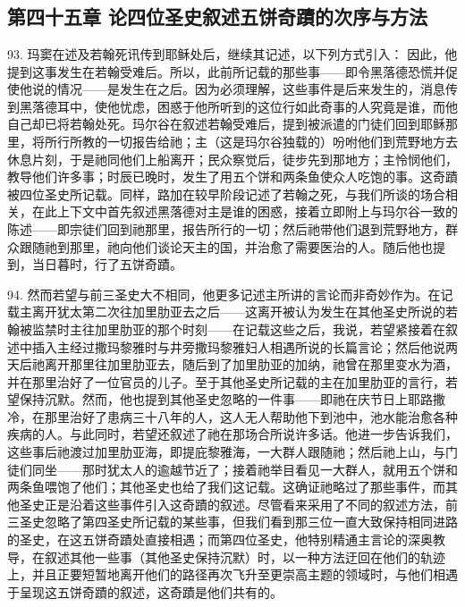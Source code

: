 
\section{}


\subsection{第四十五章 论四位圣史叙述五饼奇蹟的次序与方法}

93. 玛窦在述及若翰死讯传到耶稣处后，继续其记述，以下列方式引入： 因此，他提到这事发生在若翰受难后。所以，此前所记载的那些事——即令黑落德恐慌并促使他说的情况——是发生在之后。因为必须理解，这些事件是后来发生的，消息传到黑落德耳中，使他忧虑，困惑于他所听到的这位行如此奇事的人究竟是谁，而他自己却已将若翰处死。玛尔谷在叙述若翰受难后，提到被派遣的门徒们回到耶稣那里，将所行所教的一切报告给祂；主（这是玛尔谷独载的）吩咐他们到荒野地方去休息片刻，于是祂同他们上船离开；民众察觉后，徒步先到那地方；主怜悯他们，教导他们许多事；时辰已晚时，发生了用五个饼和两条鱼使众人吃饱的事。这奇蹟被四位圣史所记载。同样，路加在较早阶段记述了若翰之死，与我们所谈的场合相关，在此上下文中首先叙述黑落德对主是谁的困惑，接着立即附上与玛尔谷一致的陈述——即宗徒们回到祂那里，报告所行的一切；然后祂带他们退到荒野地方，群众跟随祂到那里，祂向他们谈论天主的国，并治愈了需要医治的人。随后他也提到，当日暮时，行了五饼奇蹟。\par

94. 然而若望与前三圣史大不相同，他更多记述主所讲的言论而非奇妙作为。在记载主离开犹太第二次往加里肋亚去之后——这离开被认为发生在其他圣史所说的若翰被监禁时主往加里肋亚的那个时刻——在记载这些之后，我说，若望紧接着在叙述中插入主经过撒玛黎雅时与井旁撒玛黎雅妇人相遇所说的长篇言论；然后他说两天后祂离开那里往加里肋亚去，随后到了加里肋亚的加纳，祂曾在那里变水为酒，并在那里治好了一位官员的儿子。至于其他圣史所记载的主在加里肋亚的言行，若望保持沉默。然而，他也提到其他圣史忽略的一件事——即祂在庆节日上耶路撒冷，在那里治好了患病三十八年的人，这人无人帮助他下到池中，池水能治愈各种疾病的人。与此同时，若望还叙述了祂在那场合所说许多话。他进一步告诉我们，这些事后祂渡过加里肋亚海，即提庇黎雅海，一大群人跟随祂；然后祂上山，与门徒们同坐——那时犹太人的逾越节近了；接着祂举目看见一大群人，就用五个饼和两条鱼喂饱了他们；其他圣史也给了我们这记载。这确证祂略过了那些事件，而其他圣史正是沿着这些事件引入这奇蹟的叙述。尽管看来采用了不同的叙述方法，前三圣史忽略了第四圣史所记载的某些事，但我们看到那三位一直大致保持相同进路的圣史，在这五饼奇蹟处直接相遇；而第四位圣史，他特别精通主言论的深奥教导，在叙述其他一些事（其他圣史保持沉默）时，以一种方法迂回在他们的轨迹上，并且正要短暂地离开他们的路径再次飞升至更崇高主题的领域时，与他们相遇于呈现这五饼奇蹟的叙述，这奇蹟是他们共有的。\par


